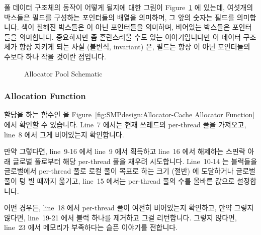 풀 데이터 구조체의 동작이 어떻게 될지에 대한 그림이
Figure~\ref{fig:SMPdesign:Allocator Pool Schematic} 에 있는데, 여섯개의
박스들은  필드를 구성하는 포인터들의 배열을 의미하며, 그 앞의 숫자는
 필드를 의미합니다.
색이 칠해진 박스들은  이 아닌 포인터들을 의미하며, 비어있는 박스들은
 포인터들을 의미합니다.
중요하지만 좀 혼란스러울 수도 있는 이야기입니다만 이 데이터 구조체가 항상
지키게 되는 사실 (불변식, invariant) 은,  필드는 항상  이 아닌
포인터들의 수보다 하나 작을 것이란 점입니다.

\begin{figure}[tbp]
\centering
{}
\caption{Allocator Pool Schematic}
\label{fig:SMPdesign:Allocator Pool Schematic}
\end{figure}

\subsubsection{Allocation Function}

할당을 하는 함수인  을
Figure~\ref{fig:SMPdesign:Allocator-Cache Allocator Function} 에서 확인할 수
있습니다.
Line~7 에서는 현재 쓰레드의 per-thread 풀을 가져오고, line~8 에서 그게
비어있는지 확인합니다.

만약 그렇다면, line~9-16 에서 line~9 에서 획득하고 line~16 에서 해제하는 스핀락
아래 글로벌 풀로부터 해당 per-thread 풀을 채우려 시도합니다.
Line~10-14 는 블럭들을 글로벌에서 per-thread 풀로 로컬 풀이 목표로 하는 크기
(절반) 에 도달하거나 글로벌 풀이 텅 빌 때까지 옮기고, line~15 에서는 per-thread
풀의 수를 올바른 값으로 설정합니다.

어떤 경우든, line~18 에서 per-thread 풀이 여전히 비어있는지 확인하고, 만약
그렇지 않다면, line~19-21 에서 블럭 하나를 제거하고 그걸 리턴합니다.
그렇지 않다면, line~23 에서 메모리가 부족하다는 슬픈 이야기를 전합니다.
\iffalse

